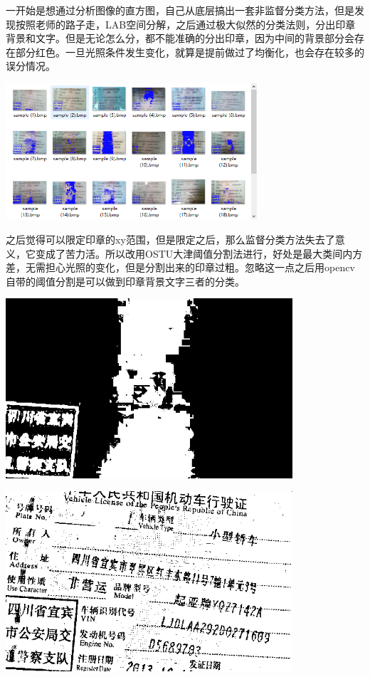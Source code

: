 \documentclass[a4paper,16pt,UTF8]{article}
\begin{document}
一开始是想通过分析图像的直方图，自己从底层搞出一套非监督分类方法，但是发现按照老师的路子走，LAB空间分解，之后通过极大似然的分类法则，分出印章背景和文字。但是无论怎么分，都不能准确的分出印章，因为中间的背景部分会存在部分红色。一旦光照条件发生变化，就算是提前做过了均衡化，也会存在较多的误分情况。

\includegraphics[width = 0.7\textwidth]{test01.jpg}

之后觉得可以限定印章的xy范围，但是限定之后，那么监督分类方法失去了意义，它变成了苦力活。所以改用OSTU大津阈值分割法进行，好处是最大类间内方差，无需担心光照的变化，但是分割出来的印章过粗。忽略这一点之后用opencv自带的阈值分割是可以做到印章背景文字三者的分类。

\includegraphics[width = 0.8\textwidth]{test03.jpg}

\includegraphics[width = 0.8\textwidth]{test02.jpg}
\end{document}
